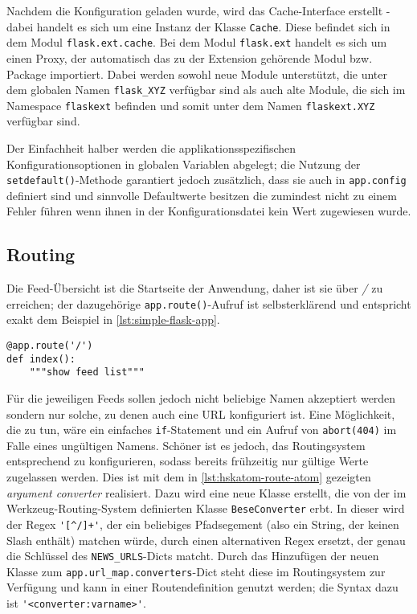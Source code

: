 Nachdem die Konfiguration geladen wurde, wird das Cache-Interface erstellt - dabei handelt es sich
um eine Instanz der Klasse \lstinline{Cache}. Diese befindet sich in dem Modul
\lstinline{flask.ext.cache}. Bei dem Modul \lstinline{flask.ext} handelt es sich um einen Proxy, der
automatisch das zu der Extension gehörende Modul bzw. Package importiert. Dabei werden sowohl neue
Module unterstützt, die unter dem globalen Namen \lstinline{flask_XYZ} verfügbar sind als auch alte
Module, die sich im Namespace \lstinline{flaskext} befinden und somit unter dem Namen
\lstinline{flaskext.XYZ} verfügbar sind.

Der Einfachheit halber werden die applikationsspezifischen Konfigurationsoptionen in globalen
Variablen abgelegt; die Nutzung der \lstinline{setdefault()}-Methode garantiert jedoch zusätzlich,
dass sie auch in \lstinline{app.config} definiert sind und sinnvolle Defaultwerte besitzen die
zumindest nicht zu einem Fehler führen wenn ihnen in der Konfigurationsdatei kein Wert zugewiesen
wurde.

\subsection{Routing}

Die Feed-Übersicht ist die Startseite der Anwendung, daher ist sie über \emph{/} zu erreichen; der
dazugehörige \lstinline{app.route()}-Aufruf ist selbsterklärend und entspricht exakt dem Beispiel in
\autoref{lst:simple-flask-app}.

\begin{lstlisting}[caption=HSKAtom - Routing,label=lst:hskatom-route-index]
@app.route('/')
def index():
    """show feed list"""
\end{lstlisting}

Für die jeweiligen Feeds sollen jedoch nicht beliebige Namen akzeptiert werden sondern nur solche,
zu denen auch eine URL konfiguriert ist. Eine Möglichkeit, die zu tun, wäre ein einfaches
\lstinline{if}-Statement und ein Aufruf von \lstinline{abort(404)} im Falle eines ungültigen Namens.
Schöner ist es jedoch, das Routingsystem entsprechend zu konfigurieren, sodass bereits frühzeitig
nur gültige Werte zugelassen werden. Dies ist mit dem in \autoref{lst:hskatom-route-atom} gezeigten
\emph{argument converter} realisiert. Dazu wird eine neue Klasse erstellt, die von der im
Werkzeug-Routing-System definierten Klasse \lstinline{BeseConverter} erbt. In dieser wird der Regex
\lstinline{'[^/]+'}, der ein beliebiges Pfadsegement (also ein String, der keinen Slash enthält)
matchen würde, durch einen alternativen Regex ersetzt, der genau die Schlüssel des
\lstinline{NEWS_URLS}-Dicts matcht. Durch das Hinzufügen der neuen Klasse zum
\lstinline{app.url_map.converters}-Dict steht diese im Routingsystem zur Verfügung und kann in einer
Routendefinition genutzt werden; die Syntax dazu ist \lstinline{'<converter:varname>'}.

